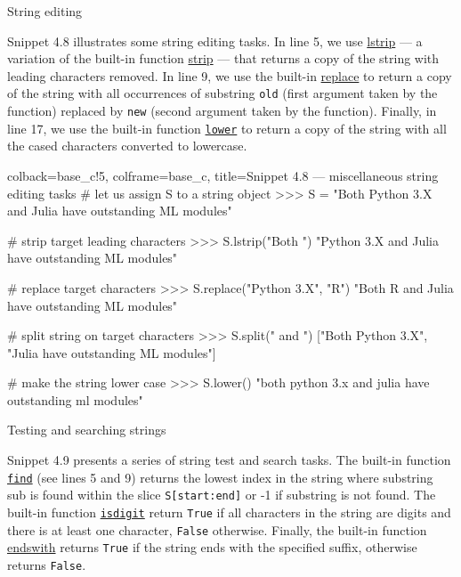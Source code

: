 \documentclass[a4paper,11pt]{book}
\numberwithin{figure}{chapter}
\numberwithin{table}{chapter}
\newcommand{\question}[1]{%
    \begin{tcolorbox}[colback=comp_c!10,colframe=comp_c,sidebyside align=top,width=\linewidth,before skip=1ex]
        #1
    \end{tcolorbox}
    \switchcolumn%
}
\newcommand{\note}[1]{%
    \begin{tcolorbox}[colback=white!0,colframe=white!10,width=\linewidth,before skip=1ex]
        #1
    \end{tcolorbox}
}
\begin{document}
\begin{paracol}{2}
	\question{\raggedright String editing}
	\note{Snippet 4.8 illustrates some string editing tasks. In line 5, we use \href{https://docs.python.org/3/library/stdtypes.html\#str.format}{lstrip} --- a variation of the built-in function \href{https://docs.python.org/3/library/stdtypes.html\#str.format}{strip} --- that returns a copy of the string with leading characters removed. In line 9, we use the built-in \href{https://docs.python.org/3/library/stdtypes.html}{replace} to return a copy of the string with all occurrences of substring \texttt{old} (first argument taken by the function) replaced by \texttt{new} (second argument taken by the function). Finally, in line 17, we use the built-in function \href{https://docs.python.org/3/library/stdtypes.html}{\texttt{lower}} to return a copy of the string with all the cased characters converted to lowercase.} 
\end{paracol}

\begin{pythoncode}[linenos=true,]{colback=base_c!5, colframe=base_c, title=\sffamily Snippet 4.8 --- miscellaneous string editing tasks}
# let us assign S to a string object
>>> S = "Both Python 3.X and Julia have outstanding ML modules"

# strip target leading characters
>>> S.lstrip("Both ")
"Python 3.X and Julia have outstanding ML modules"

# replace target characters
>>> S.replace("Python 3.X", "R")
"Both R and Julia have outstanding ML modules"

# split string on target characters
>>> S.split(" and ")
["Both Python 3.X", "Julia have outstanding ML modules"]

# make the string lower case
>>> S.lower() 
"both python 3.x and julia have outstanding ml modules"
\end{pythoncode}
\clearpage

\begin{paracol}{2}
\question{Testing and searching strings}
\note{Snippet 4.9 presents a series of string test and search tasks. The built-in function \href{https://docs.python.org/3/library/stdtypes.html}{\texttt{find}} (see lines 5 and 9) returns the lowest index in the string where substring sub is found within the slice \texttt{S[start:end]} or -1 if substring is not found.	The built-in function \href{https://docs.python.org/3/library/stdtypes.html}{\texttt{isdigit}} return \texttt{True} if all characters in the string are digits and there is at least one character, \texttt{False} otherwise. Finally, the built-in function \href{https://docs.python.org/3/library/stdtypes.html}{endswith} returns \texttt{True} if the string ends with the specified suffix, otherwise returns \texttt{False}.}
\end{paracol}
\end{document}
